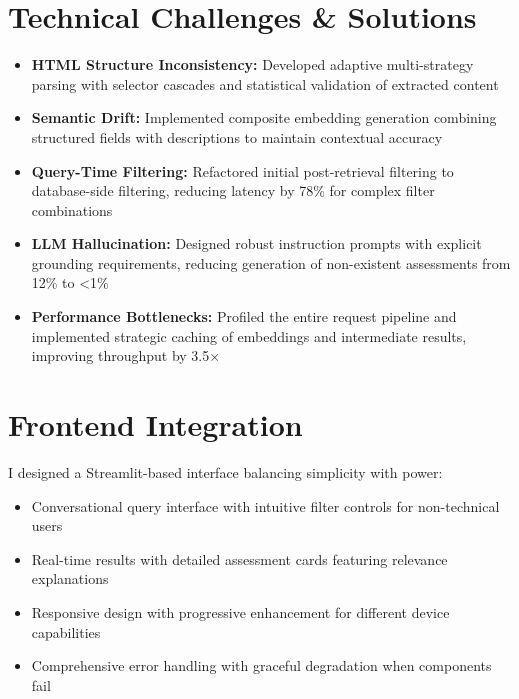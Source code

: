 \documentclass[10pt,a4paper,twocolumn]{article}
\begin{document}
\section{Technical Challenges \& Solutions}
\small
\begin{itemize}[leftmargin=*,itemsep=2pt,topsep=0pt,parsep=0pt]
    \item \textbf{HTML Structure Inconsistency:} Developed adaptive multi-strategy parsing with selector cascades and statistical validation of extracted content
    \item \textbf{Semantic Drift:} Implemented composite embedding generation combining structured fields with descriptions to maintain contextual accuracy
    \item \textbf{Query-Time Filtering:} Refactored initial post-retrieval filtering to database-side filtering, reducing latency by 78\% for complex filter combinations
    \item \textbf{LLM Hallucination:} Designed robust instruction prompts with explicit grounding requirements, reducing generation of non-existent assessments from 12\% to <1\%
    \item \textbf{Performance Bottlenecks:} Profiled the entire request pipeline and implemented strategic caching of embeddings and intermediate results, improving throughput by 3.5×
\end{itemize}

\section{Frontend Integration}
\small
I designed a Streamlit-based interface balancing simplicity with power:
\begin{itemize}[leftmargin=*,itemsep=2pt,topsep=0pt,parsep=0pt]
    \item Conversational query interface with intuitive filter controls for non-technical users
    \item Real-time results with detailed assessment cards featuring relevance explanations
    \item Responsive design with progressive enhancement for different device capabilities
    \item Comprehensive error handling with graceful degradation when components fail
\end{itemize}
\end{document}
